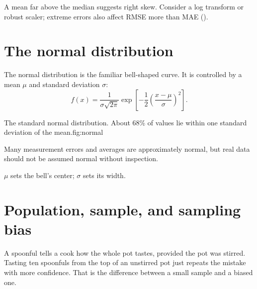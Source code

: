 \begin{keyidea}
A mean far above the median suggests right skew. Consider a log transform or robust scaler; extreme errors also affect RMSE more than MAE ().
\end{keyidea}

\section{The normal distribution}

The normal distribution is the familiar bell-shaped curve. It is controlled by a mean $\mu$ and standard deviation $\sigma$:
\[
  f(x)=\frac{1}{\sigma\sqrt{2\pi}}
  \exp\!\left[-\frac{1}{2}\left(\frac{x-\mu}{\sigma}\right)^2\right].
\]

\begin{utpfig}{The standard normal distribution. About 68\% of values lie within one standard deviation of the mean.}{fig:normal}
\end{utpfig}

Many measurement errors and averages are approximately normal, but real data should not be assumed normal without inspection.

\begin{intuition}
$\mu$ sets the bell's center; $\sigma$ sets its width.
\end{intuition}

\section{Population, sample, and sampling bias}

\begin{analogy}
A spoonful tells a cook how the whole pot tastes, provided the pot was stirred. Tasting ten spoonfuls from the top of an unstirred pot just repeats the mistake with more confidence. That is the difference between a small sample and a biased one.
\end{analogy}

